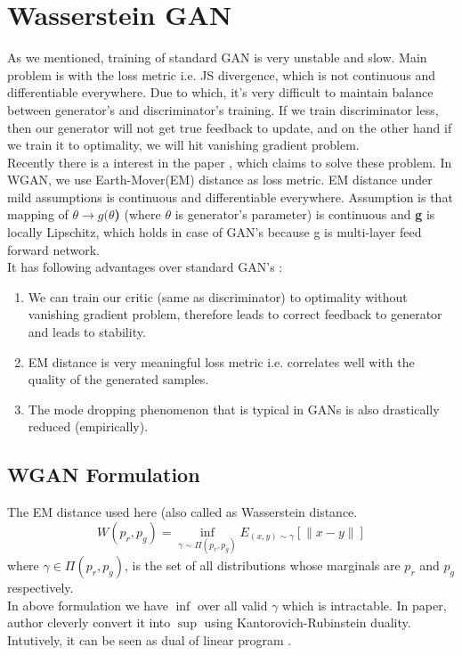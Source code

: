 \documentclass{article}
\begin{document}
\section{Wasserstein GAN }
As we mentioned, training of standard GAN is very unstable and slow. Main problem is with the loss metric i.e. JS divergence, which is not continuous and differentiable everywhere. Due to which, it's very difficult to maintain balance between generator's and discriminator's training. If we train discriminator less, then our generator will not get true feedback to update, and on the other hand if we train it to optimality, we will hit vanishing gradient problem.\\
Recently there is a interest in the paper \cite{wgan}, which claims to solve these problem. In WGAN, we use Earth-Mover(EM) distance as loss metric. EM distance under mild assumptions is continuous and differentiable everywhere. Assumption is that mapping of \textbf{$\theta \rightarrow g(\theta$)} (where $\theta$ is generator's parameter) is continuous and \textbf{g} is locally Lipschitz, which holds in case of GAN's because g is multi-layer feed forward network.\\
It has following advantages over standard GAN's : 
\begin{enumerate}
\item We can train our critic (same as discriminator) to optimality without vanishing gradient problem, therefore leads to correct feedback to generator and leads to stability.
\item EM distance is very meaningful loss metric i.e. correlates well with the quality of the generated samples.
\item The  mode dropping phenomenon that is typical in GANs is also  drastically reduced (empirically).
\end{enumerate}


\subsection{WGAN Formulation}
The EM distance used here (also called as Wasserstein distance.
\[
W(p_r, p_g) = \inf_{\gamma \sim \Pi(p_r, p_g)} E_{(x, y) \sim \gamma}[\| x-y \|]
\]
where $\gamma \in \Pi(p_r, p_g)$, is the set of all distributions whose marginals are $p_r$ and $p_g$ respectively.\\

In above formulation we have $\inf$ over all valid $\gamma$ which is intractable. In paper, author cleverly convert it into $\sup$ using Kantorovich-Rubinstein duality. Intutively, it can be seen as dual of linear program \cite{blog}.\\
\end{document}
